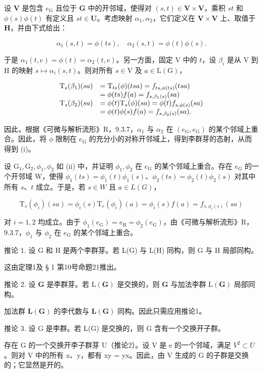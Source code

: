 设 \(\mathbf{V}\) 是包含 \(e_{\mathrm{G}}\) 且位于 \(\mathbf{G}\) 中的开邻域，使得对 \((s,t)\in \mathbf{V}\times \mathbf{V}\)，乘积 \(st\) 和 \(\phi (s)\phi (t)\) 有定义且 \(st\in \mathbf{U}\)。考虑映射 \(\alpha_{1},\alpha_{2}\)，它们定义在 \(\mathbf{V}\times \mathbf{V}\) 上、取值于 \(\mathbf{H}\)，并由下式给出：

\[
\alpha_ {1} (s, t) = \phi (t s), \quad \alpha_ {2} (s, t) = \phi (t) \phi (s).
\]

于是 \(\alpha_{1}(t,e) = \phi (t) = \alpha_{2}(t,e)\)。另一方面，固定 V 中的 \(t\)，设 \(\beta_{i}\) 是从 V 到 H 的映射 \(s\mapsto \alpha_i(s,t)\)。则对所有 \(s\in \mathrm{V}\) 及 \(a\in \mathrm{L}(\mathrm{G})\)，

\[
\begin{array}{r l} \mathrm{T} _ {s} (\beta_ {1}) (s a) & = \mathrm{T} _ {t s} (\phi) (t s a) = f _ {t s, \phi (t s)} (t s a) \\ & = \phi (t s) f (a) = f _ {s, \beta_ {1} (s)} (s a) \\ \mathrm{T} _ {s} (\beta_ {2}) (s a) & = \phi (t) \mathrm{T} _ {s} (\phi) (s a) = \phi (t) f _ {s, \phi (s)} (s a) \\ & = \phi (t) \phi (s) f (a) = f _ {s, \beta_ {2} (s)} (s a). \end{array}
\]

因此，根据《可微与解析流形》R，9.3.7，\(\alpha_{1}\) 与 \(\alpha_{2}\) 在 \((e_{\mathrm{G}}, e_{\mathrm{G}})\) 的某个邻域上重合。因此，将 \(\phi\) 限制在 \(e_{\mathrm{G}}\) 的充分小的对称开邻域上，得到李群芽的态射，从而得到 (i)。

设 \(\mathrm{G}_1, \mathrm{G}_2, \phi_1, \phi_2\) 如 (ii) 中，并证明 \(\phi_1, \phi_2\) 在 \(e_{\mathrm{G}}\) 的某个邻域上重合。存在 \(e_{\mathrm{G}}\) 的一个开邻域 W，使得 \(\phi_1(t s) = \phi_1(t)\phi_1(s)\)、\(\phi_2(t s) = \phi_2(t)\phi_2(s)\) 对其中所有 \(s\)、\(t\) 成立。于是，若 \(s \in W\) 且 \(a \in L(G)\)，

\[
\mathrm{T} _ {s} \left(\phi_ {i}\right) (s a) = \phi_ {i} (s) \mathrm{T} _ {e} \left(\phi_ {i}\right) (a) = \phi_ {i} (s) f (a) = f _ {s, \phi _ {i} (s)} (s a)
\]

对 \(i = 1,2\) 均成立。由于 \(\phi_1(e_{\mathrm{G}}) = e_{\mathrm{H}} = \phi_2(e_{\mathrm{G}})\)，由《可微与解析流形》R，9.3.7，\(\phi_1\) 与 \(\phi_2\) 在 \(e_{\mathrm{G}}\) 的某个邻域上重合。

推论 1. 设 G 和 H 是两个李群芽。若 L(G) 与 L(H) 同构，则 G 与 H 局部同构。

这由定理1及 § 1 第10号命题21推出。

推论 2. 设 \(\mathbf{G}\) 是李群芽。若 \(\mathrm{L}(\mathbf{G})\) 是交换的，则 \(\mathbf{G}\) 与加法李群 \(\mathrm{L}(\mathbf{G})\) 局部同构。

加法群 \(\mathbf{L}(\mathbf{G})\) 的李代数与 \(\mathbf{L}(\mathbf{G})\) 同构。因此只需应用推论1。

推论 3. 设 G 是李群。若 L(G) 是交换的，则 G 含有一个交换开子群。

存在 G 的一个交换开李子群芽 U（推论2）。设 V 是 e 的一个邻域，满足 \(V^{2} \subset U\)。则对 V 中的所有 x、y，都有 xy = yx。因此，由 V 生成的 G 的子群是交换的；它显然是开的。

